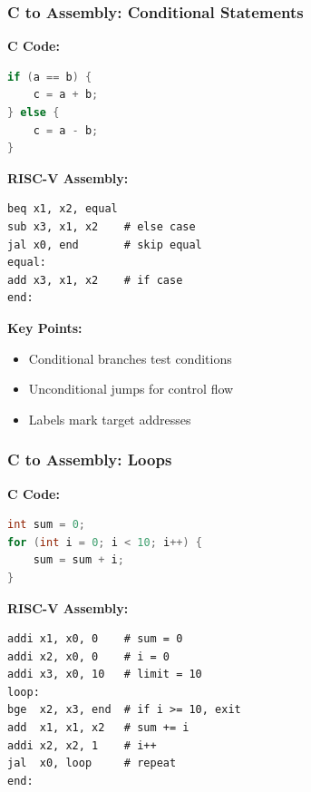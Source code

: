 \documentclass[aspectratio=169,xcolor=dvipsnames]{beamer}
\begin{document}
\begin{frame}[fragile]
\frametitle{C to Assembly: Conditional Statements}
\begin{multicols}{2}
\textbf{C Code:}
\begin{lstlisting}[language=C]
if (a == b) {
    c = a + b;
} else {
    c = a - b;
}
\end{lstlisting}

\columnbreak

\textbf{RISC-V Assembly:}
\begin{lstlisting}[language=RISC-V]
beq x1, x2, equal
sub x3, x1, x2    # else case
jal x0, end       # skip equal
equal:
add x3, x1, x2    # if case
end:
\end{lstlisting}
\end{multicols}

\vspace{1em}
\textbf{Key Points:}
\begin{itemize}
    \item Conditional branches test conditions
    \item Unconditional jumps for control flow
    \item Labels mark target addresses
\end{itemize}
\end{frame}

\begin{frame}[fragile]
\frametitle{C to Assembly: Loops}
\begin{multicols}{2}
\textbf{C Code:}
\begin{lstlisting}[language=C]
int sum = 0;
for (int i = 0; i < 10; i++) {
    sum = sum + i;
}
\end{lstlisting}

\columnbreak

\textbf{RISC-V Assembly:}
\begin{lstlisting}[language={}]
addi x1, x0, 0    # sum = 0
addi x2, x0, 0    # i = 0
addi x3, x0, 10   # limit = 10
loop:
bge  x2, x3, end  # if i >= 10, exit
add  x1, x1, x2   # sum += i
addi x2, x2, 1    # i++
jal  x0, loop     # repeat
end:
\end{lstlisting}
\end{multicols}
\end{frame}
\end{document}

